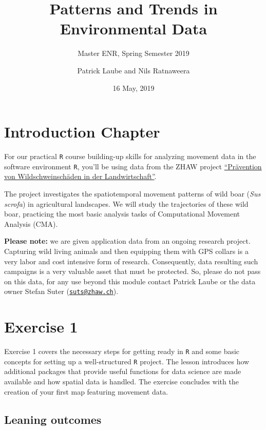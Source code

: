 \documentclass[]{book}
\title{Patterns and Trends in Environmental Data}
\subtitle{Master ENR, Spring Semester 2019}
\author{Patrick Laube and Nils Ratnaweera}
\date{16 May, 2019}
\begin{document}
\maketitle

{
\setcounter{tocdepth}{1}
\tableofcontents
}
\chapter*{Introduction Chapter}\label{introduction-chapter}

For our practical \texttt{R} course building-up skills for analyzing
movement data in the software environment \texttt{R}, you'll be using
data from the ZHAW project
\href{https://www.zhaw.ch/de/lsfm/institute-zentren/iunr/integrative-oekologie/wildtiermanagement/referenzprojekte/}{``Prävention
von Wildschweinschäden in der Landwirtschaft''}.

The project investigates the spatiotemporal movement patterns of wild
boar (\emph{Sus scrofa}) in agricultural landscapes. We will study the
trajectories of these wild boar, practicing the most basic analysis
tasks of Computational Movement Analysis (CMA).

\textbf{Please note:} we are given application data from an ongoing
research project. Capturing wild living animals and then equipping them
with GPS collars is a very labor and cost intensive form of research.
Consequently, data resulting such campaigns is a very valuable asset
that must be protected. So, please do not pass on this data, for any use
beyond this module contact Patrick Laube or the data owner Stefan Suter
(\href{mailto:suts@zhaw.ch}{\nolinkurl{suts@zhaw.ch}}).

\chapter{Exercise 1}\label{exercise-1}

Exercise 1 covers the necessary steps for getting ready in \texttt{R}
and some basic concepts for setting up a well-structured \texttt{R}
project. The lesson introduces how additional packages that provide
useful functions for data science are made available and how spatial
data is handled. The exercise concludes with the creation of your first
map featuring movement data.

\section{Leaning outcomes}\label{leaning-outcomes}
\end{document}
